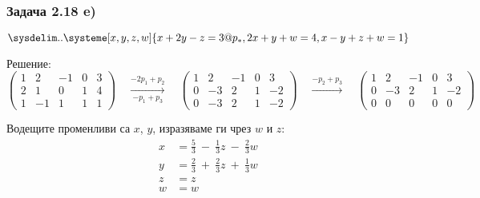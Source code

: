 \documentclass{subfiles}
\begin{document}
\subsubsection{Задача 2.18 e)}

\begin{equation*}
    \sysdelim..\systeme[x,y,z,w]{
        x + 2y - z = 3@p_{*},
        2x + y + w = 4,
        x - y + z + w = 1
    }
\end{equation*}

\noindent Решение:
\begin{equation*}
    \left(
        \begin{array}{ cccc|c }
            1 & 2  & -1 & 0 & 3 \\
            2 & 1  & 0 & 1 & 4 \\
            1 & -1 & 1 & 1 & 1
        \end{array}
    \right)
    \quad
    \overset{-2p_{1}+p_{2}}{\underset{-p_{1}+p_{3}}{\longrightarrow}}
    \quad
    \left(
        \begin{array}{ cccc|c }
            1 & 2  & -1 & 0 & 3 \\
            0 & -3 & 2 & 1 & -2 \\
            0 & -3 & 2 & 1 & -2
        \end{array}
    \right)
    \quad
    \overset{-p_{2}+p_{3}}{\longrightarrow}
    \quad
    \left(
        \begin{array}{ cccc|c }
            1 & 2  & -1 & 0 & 3 \\
            0 & -3 & 2 & 1 & -2 \\
            0 & 0 & 0 & 0  & 0
        \end{array}
    \right)
\end{equation*}

\noindent Водещите променливи са $x$, $y$, изразяваме ги чрез $w$ и $z$:
\begin{align*}
    x &= \frac{5}{3}\ −\ \frac{1}{3}z\ −\ \frac{2}{3}w \\
    y &= \frac{2}{3}\ +\ \frac{2}{3}z\ +\ \frac{1}{3}w \\
    z &= z \\
    w &= w
\end{align*}
\end{document}
